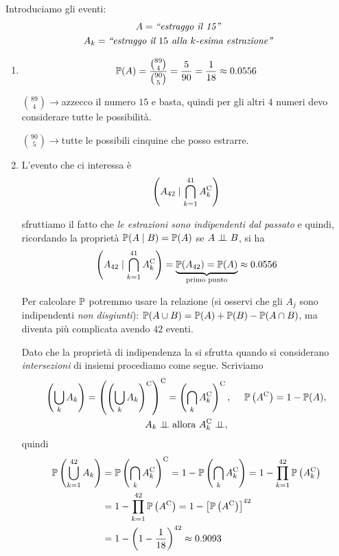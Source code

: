 Introduciamo gli eventi:
\begin{gather*}
	A=\emph{``estraggo il 15''}\\
	A_{k} =\emph{``estraggo il $15$ alla $k$-esima estrazione''}
\end{gather*}
\begin{enumerate}
	\item
	\begin{equation*}
		\mathbb{P}(A) =\frac{\binom{89}{4}}{\binom{90}{5}} =\frac{5}{90} =\frac{1}{18} \approx 0.0556
	\end{equation*}

	$\binom{89}{4}\rightarrow $azzecco il numero $15$ e basta, quindi per gli altri $4$ numeri devo considerare tutte le possibilità.

$\binom{90}{5}\rightarrow $tutte le possibili cinquine che posso estrarre.
\item L'evento che ci interessa è\begin{equation*}
\left(A_{42} \mid \bigcap _{k=1}^{41} A_{k}^{\mathrm{C}}\right)
\end{equation*}

sfruttiamo il fatto che \textit{le estrazioni sono indipendenti dal passato} e quindi, ricordando la proprietà $\mathbb{P}(A\mid B) =\mathbb{P}(A)$ se $A\perp \!\!\! \perp B$, si ha
\begin{equation*}
\left(A_{42} \mid\bigcap _{k=1}^{41} A_{k}^{\mathrm{C}}\right) =\underbrace{\mathbb{P}(A_{42}) =\mathbb{P}(A)}_{\text{primo punto}} \approx 0.0556
\end{equation*}

	Per calcolare $\mathbb{P}$ potremmo usare la relazione (si osservi che gli $A_{j}$ sono indipendenti \textit{non disgiunti}): $\mathbb{P}(A\cup B) =\mathbb{P}(A) +\mathbb{P}(B) -\mathbb{P}(A\cap B)$, ma diventa più complicata avendo $42$ eventi.

	Dato che la proprietà di indipendenza la si sfrutta quando si considerano \textit{intersezioni} di insiemi procediamo come segue. Scriviamo
	\begin{gather*}
		\left(\bigcup_{k} A_{k}\right) =\left(\left(\bigcup_{k} A_{k}\right)\complementary\right)\complementary =\left(\bigcap_{k} A_{k}\complementary\right)\complementary ,\ \ \ \ \PP\left(A\complementary\right) =1-\PP(A) ,\\
		A_{k} \indep \text{allora} \ A_{k}\complementary \indep ,
	\end{gather*}
	quindi
	\begin{align*}
		\mathbb{P}\left(\bigcup_{k=1}^{42} A_{k}\right) & =\mathbb{P}\left(\bigcap_{k} A_{k}^{\mathrm{C}}\right)^{\mathrm{C}} =1-\mathbb{P}\left(\bigcap_{k} A_{k}^{\mathrm{C}}\right) =1-\prod_{k=1}^{42}\mathbb{P}\left(A_{k}^{\mathrm{C}}\right)\\
		 & =1-\prod_{k=1}^{42}\mathbb{P}\left(A^{\mathrm{C}}\right) =1-\left[\mathbb{P}\left(A^{\mathrm{C}}\right)\right]^{42}\\
		 & =1-\left(1-\frac{1}{18}\right)^{42} \approx 0.9093
	\end{align*}


\end{enumerate}
